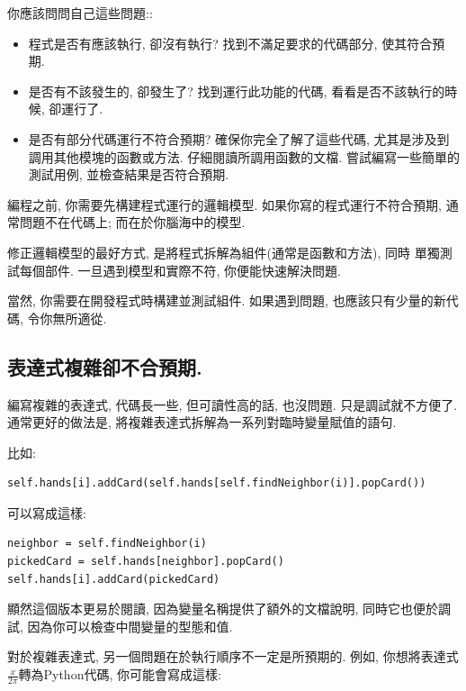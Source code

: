 \documentclass[10pt]{book}
\begin{document}
你應該問問自己這些問題::

\begin{itemize}

\item 程式是否有應該執行, 卻沒有執行?
找到不滿足要求的代碼部分, 使其符合預期. 

\item 是否有不該發生的, 卻發生了?
找到運行此功能的代碼, 看看是否不該執行的時候, 卻運行了. 

\item 是否有部分代碼運行不符合預期? 
確保你完全了解了這些代碼, 尤其是涉及到調用其他模塊的函數或方法. 
仔細閱讀所調用函數的文檔. 
嘗試編寫一些簡單的測試用例, 並檢查結果是否符合預期. 
\end{itemize}

編程之前, 你需要先構建程式運行的邏輯模型. 
如果你寫的程式運行不符合預期, 
通常問題不在代碼上; 而在於你腦海中的模型. 

修正邏輯模型的最好方式, 是將程式拆解為組件(通常是函數和方法), 同時
單獨測試每個部件. 
一旦遇到模型和實際不符, 你便能快速解決問題. 

當然, 你需要在開發程式時構建並測試組件. 
如果遇到問題, 也應該只有少量的新代碼, 令你無所適從. 


\subsection{表達式複雜卻不合預期.}

編寫複雜的表達式, 代碼長一些, 但可讀性高的話, 也沒問題.
只是調試就不方便了. 
通常更好的做法是, 將複雜表達式拆解為一系列對臨時變量賦值的語句. 

比如:

\begin{verbatim}
self.hands[i].addCard(self.hands[self.findNeighbor(i)].popCard())
\end{verbatim}
%
可以寫成這樣:

\begin{verbatim}
neighbor = self.findNeighbor(i)
pickedCard = self.hands[neighbor].popCard()
self.hands[i].addCard(pickedCard)
\end{verbatim}
%

顯然這個版本更易於閱讀, 因為變量名稱提供了額外的文檔說明, 
同時它也便於調試, 因為你可以檢查中間變量的型態和值. 

對於複雜表達式, 另一個問題在於執行順序不一定是所預期的. 
例如, 你想將表達式$\frac{x}{2 \pi}$轉為Python代碼, 
你可能會寫成這樣:
\end{document}
